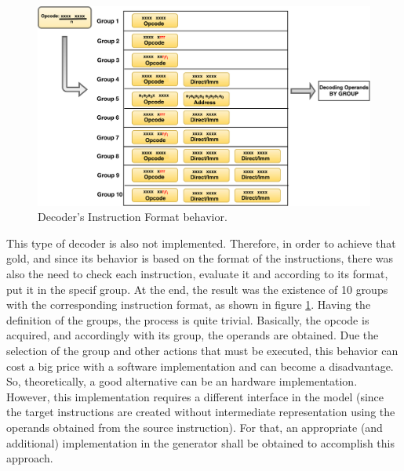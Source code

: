    
    \begin{figure}[!htb]
    \centerline{
    \includegraphics[scale=0.4]{images/Decoders_Behaviors3}
    }
    \caption{Decoder's Instruction Format behavior.}
    \label{fig:Decoders_Behavior3} 
    \end{figure}
	
    This type of decoder is also not implemented. Therefore, in order to achieve that gold, and since its behavior is based on the format of the instructions, there was also the need to check each instruction, evaluate it and according to its format, put it in the specif group. At the end, the result was the existence of 10 groups with the corresponding instruction format, as shown in figure \ref{fig:Decoders_Behavior3}. 
	Having the definition of the groups, the process is quite trivial. Basically, the opcode is acquired, and accordingly with its group, the operands are obtained. Due the selection of the group and other actions that must be executed, this behavior can cost a big price with a software implementation and can become a disadvantage. So, theoretically, a good alternative can be an hardware implementation. However, this implementation requires a different interface in the model (since the target instructions are created without intermediate representation using the operands obtained from the source instruction). For that, an appropriate (and additional) implementation in the generator shall be obtained to accomplish this approach. 